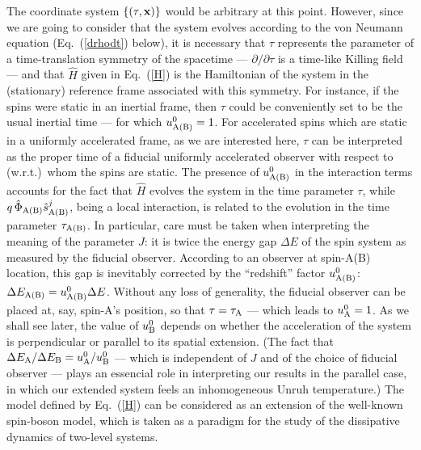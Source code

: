 \documentclass[]{nature}
\begin{document}
The coordinate system $\{(\tau,\bf{x})\}$ would be arbitrary at this point.
However, since we are going to consider that the system evolves according to the von Neumann equation (Eq.~(\ref{drhodt}) below), 
it is necessary that $\tau$ represents the parameter of a time-translation symmetry of the spacetime --- $\partial /\partial \tau$ is a time-like Killing field --- and that 
$\hat H$ given in Eq.~(\ref{H}) is the  Hamiltonian of the system in the (stationary) reference frame associated with this symmetry. 
For instance, if the spins  were  static in an inertial frame, then  $\tau$ could be conveniently set to be the usual inertial time --- for which $u_{\rm A(B)}^0 = 1$. For
accelerated spins which are static in a uniformly accelerated frame, as we are interested here,  $\tau$ 
can be interpreted as the proper time of a fiducial uniformly accelerated observer with respect to (w.r.t.)~whom the spins are static.
The presence of $u_{\rm A(B)}^0$ in the interaction terms accounts for the fact that  $\hat H$ evolves the system in the time parameter 
$\tau$, while
$q \,\hat \Phi_{\rm A(B)} {\hat s}^j_{\rm A(B)}$, being a local interaction, is related to the evolution in the time parameter $\tau_{\rm A(B)}$.
In particular, care must be taken when interpreting
the meaning of the parameter $J$: it is twice the energy gap $\Delta E$ of the spin system  as measured by the fiducial observer.
According to an observer at spin-A(B) location, this gap is inevitably corrected by the ``redshift'' factor $u_{\rm A(B)}^0$: $\Delta E_{\rm A(B)} = u_{\rm A(B)}^0 \Delta E$.
Without any loss of generality, 
the fiducial observer can be placed at, say, spin-A's position, so that $\tau = \tau_{\rm A}$ 
--- which leads to
$u_{\rm A}^0 = 1$. As we shall see later,
the value of $u_{\rm B}^0$ depends on whether the acceleration of the system is perpendicular or parallel to  its spatial 
extension.
(The fact that $\Delta E_{\rm A}/\Delta E_{\rm B} = u_{\rm A}^0/u_{\rm B}^0$ --- which is independent of $J$ and of the choice of fiducial observer ---
plays an essencial role in interpreting our results in the parallel case,  in which our extended system feels an
inhomogeneous Unruh temperature.)
The  model defined 
by Eq.~(\ref{H}) can be considered as an extension of the well-known spin-boson model, which is taken as a paradigm for the study of the dissipative dynamics of two-level systems\cite{leggett}.
\end{document}
